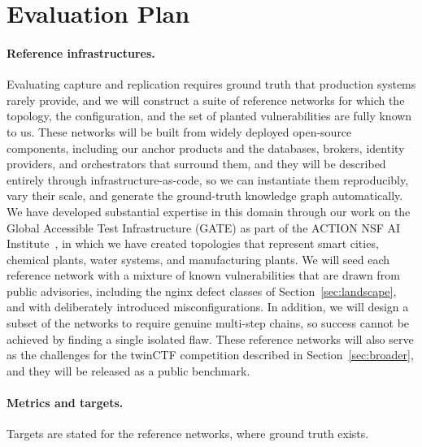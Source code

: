 \section{Evaluation Plan}
\label{sec:evaluation}

\paragraph{Reference infrastructures.}
Evaluating capture and replication requires ground truth that production systems rarely provide, and we will construct a
suite of reference networks for which the topology, the configuration, and the set of planted
vulnerabilities are fully known to us. These networks will be built from
widely deployed open-source components, including our anchor products and the
databases, brokers, identity providers, and orchestrators that surround them,
and they will be described entirely through infrastructure-as-code, so we can instantiate
them reproducibly, vary their scale, and generate the
ground-truth knowledge graph automatically. We have developed substantial
expertise in this domain through our work on the Global Accessible Test
Infrastructure (GATE) as part of the ACTION NSF AI
Institute~\cite{action}, in which we have created topologies that represent
smart cities, chemical plants, water systems, and manufacturing plants. We
will seed each reference network with a mixture of known vulnerabilities that
are drawn from public advisories, including the nginx defect classes of
Section~\ref{sec:landscape}, and with deliberately introduced
misconfigurations. In addition, we will design a subset of the networks to
require genuine multi-step chains, so success cannot be achieved by finding a
single isolated flaw. These reference networks will also serve as
the challenges for the twinCTF competition described in
Section~\ref{sec:broader}, and they will be released as a public benchmark.

\paragraph{Metrics and targets.}
Targets are stated for the reference networks, where ground truth exists.

